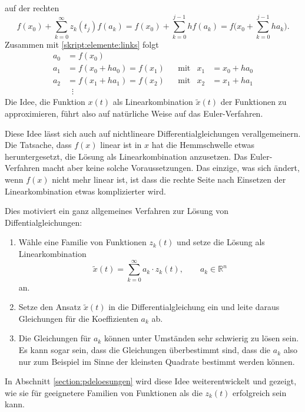 auf der  rechten
\begin{equation}
f(x_0) + \sum_{k=0}^\infty z_k(t_j) f(a_k)
=
f(x_0) + \sum_{k=0}^{j-1} hf(a_k)
=
f\biggl(x_0 + \sum_{k=0}^{j-1} ha_k\biggr).
\label{skript:elemente:rechts}
\end{equation}
Zusammen mit \eqref{skript:elemente:links} folgt
\[
\begin{aligned}
a_0 &= f(x_0)                 &&          &    & \\
a_1 &= f(x_0 + ha_0) = f(x_1) &&\text{mit}&x_1 &= x_0 + ha_0\\
a_2 &= f(x_1 + ha_1) = f(x_2) &&\text{mit}&x_2 &= x_1 + ha_1\\
    &\;\;\vdots
\end{aligned}
\]
Die Idee, die Funktion $x(t)$ als Linearkombination $\tilde{x}(t)$
der Funktionen zu approximieren, führt also auf natürliche Weise
auf das Euler-Verfahren.

Diese Idee lässt sich auch auf nichtlineare Differentialgleichungen
verallgemeinern.
Die Tatsache, dass $f(x)$ linear ist in $x$ hat die Hemmschwelle etwas
heruntergesetzt, die Lösung als Linearkombination anzusetzen.
Das Euler-Verfahren macht aber keine solche Voraussetzungen.
Das einzige, was sich ändert, wenn $f(x)$ nicht mehr linear ist,
ist dass die rechte Seite nach Einsetzen der Linearkombination
etwas komplizierter wird.

Dies motiviert ein ganz allgemeines Verfahren zur Lösung von
Diffentialgleichungen:
\begin{enumerate}
\item Wähle eine Familie von Funktionen $z_k(t)$ und setze die Lösung
als Linearkombination
\[
\tilde{x}(t) = \sum_{k=0}^\infty a_k\cdot z_k(t), \qquad a_k\in\mathbb R^n
\]
an.
\item Setze den Ansatz $\tilde{x}(t)$ in die Differentialgleichung ein
und leite daraus Gleichungen für die Koeffizienten $a_k$ ab.
\item Die Gleichungen für $a_k$ können unter Umständen sehr schwierig 
zu lösen sein.
Es kann sogar sein, dass die Gleichungen überbestimmt sind, dass die
$a_k$ also nur zum Beispiel im Sinne der kleinsten Quadrate bestimmt
werden können.
\end{enumerate}
In Abschnitt \ref{section:pdeloesungen} wird diese Idee weiterentwickelt
und gezeigt, wie sie für geeignetere Familien von Funktionen als die $z_k(t)$
erfolgreich sein kann.



